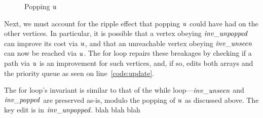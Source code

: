 {\begin{figure}[htbp]
  \caption{Popping $\mathit{u}$}
\end{figure}

Next, we must account for the ripple effect that popping
$\mathit{u}$ could have had on the other vertices.
In particular, it is possible that a vertex obeying $\mathit{inv\_unpopped}$ can
improve its cost via $\mathit{u}$, and that an unreachable vertex
obeying $\mathit{inv\_unseen}$ can now be reached via $\mathit{u}$.
The for loop repairs these breakages by
checking if a path via $\mathit{u}$ is an improvement for such vertices, and, if so,
edits both arrays and the priority queue as seen on line~\ref{code:update}.

The for loop's invariant is similar to that of the while loop---$\mathit{inv\_unseen}$
and $\mathit{inv\_popped}$ are preserved as-is, modulo the popping of
$\mathit{u}$ as discussed above. The key edit is in $\mathit{inv\_unpopped}$. blah blah blah

}






